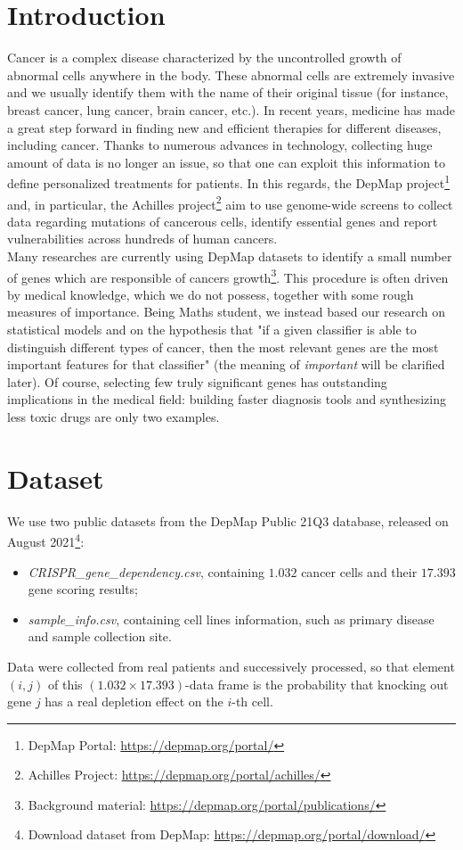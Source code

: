 \documentclass[a4paper,11pt, oneside]{article}  %
\begin{document}
\section{Introduction}
Cancer is a complex disease characterized by the uncontrolled growth of abnormal cells anywhere in the body. These abnormal cells are extremely invasive and we usually identify them with the name of their original tissue (for instance, breast cancer, lung cancer,  brain cancer, etc.).  In recent years,  medicine has made a great step forward in finding new and efficient therapies for different diseases,  including cancer.  Thanks to numerous advances in technology,  collecting huge amount of data is no longer an issue,  so that one can exploit this information to define personalized treatments for patients.  In this regards,  the DepMap project\footnote{DepMap Portal: \url{https://depmap.org/portal/} } and,  in particular,  the Achilles project\footnote{Achilles Project: \url{https://depmap.org/portal/achilles/} } aim to use genome-wide screens to collect data regarding mutations of cancerous cells,  identify essential genes and report vulnerabilities across hundreds of human cancers.  \\

Many researches are currently using DepMap datasets to identify a small number of genes which are responsible of cancers growth\footnote{Background material: \url{https://depmap.org/portal/publications/}}. This procedure is often driven by medical knowledge,  which we do not possess,  together with some rough measures of importance.  Being Maths student, we instead based our research on statistical models and on the hypothesis that "if a given classifier is able to distinguish different types of cancer,  then the most relevant genes are the most important features for that classifier" (the meaning of \textit{important} will be clarified later).  Of course,  selecting few truly significant genes has outstanding implications in the medical field: building faster diagnosis tools and synthesizing less toxic drugs are only two examples. 


\section{Dataset}
We use two public datasets from the DepMap Public 21Q3 database,  released on August 2021\footnote{Download dataset from DepMap:  \url{https://depmap.org/portal/download/}}:
\begin{itemize}
	\item \textit{CRISPR\_gene\_dependency.csv}, containing $1.032$ cancer cells and their $17.393$ gene scoring results;
	\item \textit{sample\_info.csv}, containing cell lines information,  such as primary disease and sample collection site.
\end{itemize}
Data were collected from real patients and successively processed,  so that element $(i, j)$ of this $(1.032 \times 17.393)$-data frame is the probability that knocking out gene $j$ has a real depletion effect on the $i$-th cell.
\end{document}
